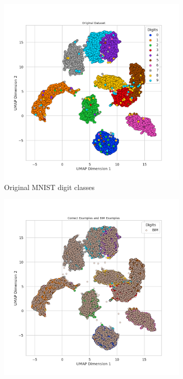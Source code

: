 \documentclass[10pt, conference, a4paper, final]{IEEEtran}
\begin{document}
\begin{figure}[!ht]
    \centering
    \begin{subfigure}{.25\textwidth}
        \centering
        \includegraphics[width=\linewidth]{UMAP/UMAP_Original Dataset.png}
        \caption{Original MNIST digit classes}
        \label{fig:umap_original}
    \end{subfigure}%
    \hfill
    \begin{subfigure}{.25\textwidth}
        \centering
        \includegraphics[width=\linewidth]{UMAP/UMAP_Combined_BIM.png}

\end{subfigure}
\end{figure}
\end{document}
